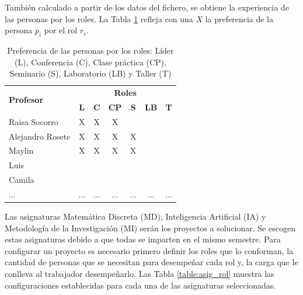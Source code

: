 También calculado a partir de los datos del fichero, se obtiene la experiencia de las personas por los roles.  La Tabla \ref{table:pref-pers-roles-doc} refleja con una $X$ la preferencia de la persona $p_i$ por el rol $r_i$.


\begin{table}[H]
	\centering
	\caption{Preferencia de las personas por los roles: Líder (L), Conferencia (C), Clase práctica (CP), Seminario (S), Laboratorio (LB) y Taller (T)}\label{table:pref-pers-roles-doc}
	\begin{tabular}{l c c c c c c }
		\toprule
		\multirow{2}{2.5cm}{\textbf{Profesor}} &                                              \multicolumn{6}{c}{\textbf{Roles}}                                               \\ \cline{2-7}
		& \textbf{L} & \textbf{C} & \textbf{CP} & \textbf{S} & \textbf{LB} & \textbf{T} \\ \midrule
		Raisa Socorro                          & X              & X                    & X                       &                    &  \\ \hline
		Alejandro Rosete                       & X              & X                    & X                       & X                  &  \\ \hline
		Maylin                                 & X              & X                    & X                       & X                  &  \\ \hline
		Luis                                   &                &                      &                         &                    &  \\ \hline
		Camila                                 &                &                      &                         &                    &  \\ \hline
		...                                    & ...            & ...                  & ...                     & ...                & ...                  & ...             \\ \bottomrule
	\end{tabular}
\end{table}



Las asignaturas Matemática Discreta (MD), Inteligencia Artificial (IA) y Metodología de la Investigación (MI) serán los proyectos a solucionar. Se escogen estas asignaturas debido a que todas se imparten en el mismo semestre.  Para configurar un proyecto es necesario primero definir los roles que lo conforman, la cantidad de personas que se necesitan para desempeñar cada rol y, la carga que le conlleva al trabajador desempeñarlo. Las Tabla \ref{table:asig_rol} muestra las configuraciones establecidas para cada una de las asignaturas seleccionadas. 


